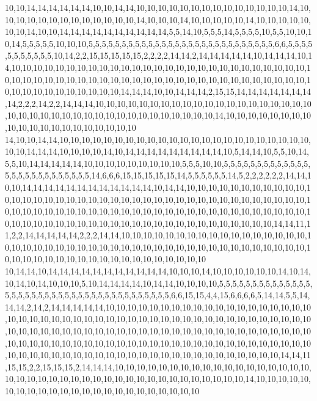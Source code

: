 10,10,14,14,14,14,14,14,10,10,14,14,10,10,10,10,10,10,10,10,10,10,10,10,10,10,14,10,10,10,10,10,10,10,10,10,10,10,10,10,14,10,10,10,14,10,10,10,10,10,14,10,10,10,10,10,10,10,14,10,10,14,14,14,14,14,14,14,14,14,14,5,5,14,10,5,5,5,14,5,5,5,5,10,5,5,10,10,10,14,5,5,5,5,5,10,10,10,5,5,5,5,5,5,5,5,5,5,5,5,5,5,5,5,5,5,5,5,5,5,5,5,5,5,5,5,6,6,5,5,5,5,5,5,5,5,5,5,5,10,14,2,2,15,15,15,15,15,2,2,2,2,14,14,2,14,14,14,14,14,10,14,14,14,10,14,10,10,10,10,10,10,10,10,10,10,10,10,10,10,10,10,10,10,10,10,10,10,10,10,10,10,10,10,10,10,10,10,10,10,10,10,10,10,10,10,10,10,10,10,10,10,10,10,10,10,10,10,10,10,10,10,10,10,10,10,10,10,10,10,10,10,14,14,14,10,10,14,14,14,2,15,15,14,14,14,14,14,14,14,14,2,2,2,14,2,2,14,14,14,10,10,10,10,10,10,10,10,10,10,10,10,10,10,10,10,10,10,10,10,10,10,10,10,10,10,10,10,10,10,10,10,10,10,10,10,10,10,10,14,10,10,10,10,10,10,10,10,10,10,10,10,10,10,10,10,10,10,10,10
14,10,10,14,14,10,10,10,10,10,10,10,10,10,10,10,10,10,10,10,10,10,10,10,10,10,10,10,10,10,14,14,14,10,10,10,10,14,10,14,14,14,14,14,14,14,14,14,10,5,14,14,10,5,5,10,14,5,5,10,14,14,14,14,14,10,10,10,10,10,10,10,10,10,5,5,5,10,10,5,5,5,5,5,5,5,5,5,5,5,5,5,5,5,5,5,5,5,5,5,5,5,5,5,5,14,6,6,6,15,15,15,15,15,14,5,5,5,5,5,5,14,5,2,2,2,2,2,2,14,14,10,10,14,14,14,14,14,14,14,14,14,14,14,14,10,14,14,10,10,10,10,10,10,10,10,10,10,10,10,10,10,10,10,10,10,10,10,10,10,10,10,10,10,10,10,10,10,10,10,10,10,10,10,10,10,10,10,10,10,10,10,10,10,10,10,10,10,10,10,10,10,10,10,10,10,10,10,10,10,10,10,10,10,10,10,10,10,10,10,10,10,10,10,10,10,10,10,10,10,10,10,10,10,10,10,10,10,10,10,14,14,11,11,2,2,14,14,14,14,14,2,2,2,14,14,10,10,10,10,10,10,10,10,10,10,10,10,10,10,10,10,10,10,10,10,10,10,10,10,10,10,10,10,10,10,10,10,10,10,10,10,10,10,10,10,10,10,10,10,10,10,10,10,10,10,10,10,10,10,10,10,10,10,10,10,10,10,10,10
10,14,14,10,14,14,14,14,14,14,14,14,14,14,14,10,10,10,14,10,10,10,10,10,10,14,10,14,10,14,10,14,10,10,10,5,10,14,14,14,14,10,14,14,10,10,10,10,5,5,5,5,5,5,5,5,5,5,5,5,5,5,5,5,5,5,5,5,5,5,5,5,5,5,5,5,5,5,5,5,5,5,5,5,5,5,5,6,6,15,15,4,4,15,6,6,6,6,5,14,14,5,5,14,14,14,2,14,2,14,14,14,14,14,10,10,10,10,10,10,10,10,10,10,10,10,10,10,10,10,10,10,10,10,10,10,10,10,10,10,10,10,10,10,10,10,10,10,10,10,10,10,10,10,10,10,10,10,10,10,10,10,10,10,10,10,10,10,10,10,10,10,10,10,10,10,10,10,10,10,10,10,10,10,10,10,10,10,10,10,10,10,10,10,10,10,10,10,10,10,10,10,10,10,10,10,10,10,10,10,10,10,10,10,10,10,10,10,10,10,10,10,10,10,10,10,10,10,10,10,10,10,10,10,10,10,10,10,10,10,10,10,14,14,11,15,15,2,2,15,15,15,2,14,14,14,10,10,10,10,10,10,10,10,10,10,10,10,10,10,10,10,10,10,10,10,10,10,10,10,10,10,10,10,10,10,10,10,10,10,10,10,10,10,10,10,14,10,10,10,10,10,10,10,10,10,10,10,10,10,10,10,10,10,10,10,10,10,10,10
